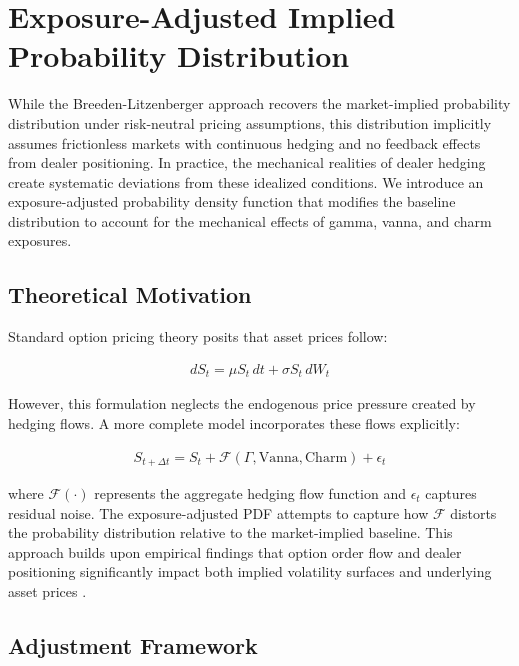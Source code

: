 \documentclass[11pt, a4paper]{article}
\begin{document}
\section{Exposure-Adjusted Implied Probability Distribution}
\label{sec:exposure-adjusted-pdf}

While the Breeden-Litzenberger approach recovers the market-implied probability distribution under risk-neutral pricing assumptions, this distribution implicitly assumes frictionless markets with continuous hedging and no feedback effects from dealer positioning. In practice, the mechanical realities of dealer hedging create systematic deviations from these idealized conditions. We introduce an exposure-adjusted probability density function that modifies the baseline distribution to account for the mechanical effects of gamma, vanna, and charm exposures.

\subsection{Theoretical Motivation}

Standard option pricing theory posits that asset prices follow:

\begin{align}
dS_t = \mu S_t \, dt + \sigma S_t \, dW_t
\end{align}

However, this formulation neglects the endogenous price pressure created by hedging flows. A more complete model incorporates these flows explicitly:

\begin{align}
S_{t+\Delta t} = S_t + \mathcal{F}(\Gamma, \text{Vanna}, \text{Charm}) + \epsilon_t
\end{align}

where $\mathcal{F}(\cdot)$ represents the aggregate hedging flow function and $\epsilon_t$ captures residual noise. The exposure-adjusted PDF attempts to capture how $\mathcal{F}$ distorts the probability distribution relative to the market-implied baseline. This approach builds upon empirical findings that option order flow and dealer positioning significantly impact both implied volatility surfaces \cite{bollen2004does} and underlying asset prices \cite{garleanu2009demand, ni2008volatility}.

\subsection{Adjustment Framework}
\end{document}
